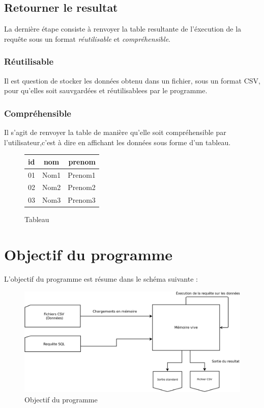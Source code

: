 \documentclass[oneside,13pt,a4paper]{report}
\begin{document}
\subsection{Retourner le resultat}

La dernière étape consiste à renvoyer la table resultante de l'éxecution de la requête sous un format \textit{réutilisable} et \textit{compréhensible}.

\subsubsection{Réutilisable}

Il est question de stocker les données obtenu dans un fichier, sous un format CSV, pour qu'elles soit sauvgardées et réutilisablees par le programme.

\pagebreak

\subsubsection{Compréhensible}

Il s'agit de renvoyer la table de manière qu'elle soit compréhensible par l'utilisateur,c'est à dire en affichant les données sous forme d'un tableau.

\begin{figure}[h!]
		\centering
		\caption{Tableau}
		\vspace{0.1cm}
		\begin{tabular}{|l|c|r|}
			\hline
			id   & nom  & prenom 
			\\
			\hline
			01 & Nom1 &  Prenom1 \\
			02 & Nom2 &  Prenom2 \\
			03 & Nom3 &  Prenom3 \\
			\hline
		\end{tabular}
\end{figure}

\section{Objectif du programme}

L'objectif du programme est résume dans le schéma suivante :
\begin{figure}[!h]
	\centering
	\includegraphics[width=1\textwidth]{img/role_prog.png} %
	\vspace{0.1cm}
	\caption{Objectif du programme}
\end{figure}
\end{document}

